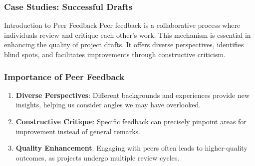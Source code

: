 \documentclass[aspectratio=169]{beamer}
\begin{document}
\begin{frame}[fragile]
    \frametitle{Case Studies: Successful Drafts}
    \begin{block}{Introduction to Peer Feedback}
        Peer feedback is a collaborative process where individuals review and critique each other's work. This mechanism is essential in enhancing the quality of project drafts. It offers diverse perspectives, identifies blind spots, and facilitates improvements through constructive criticism.
    \end{block}
\end{frame}

\begin{frame}[fragile]
    \frametitle{Importance of Peer Feedback}
    \begin{enumerate}
        \item \textbf{Diverse Perspectives}: Different backgrounds and experiences provide new insights, helping us consider angles we may have overlooked.
        \item \textbf{Constructive Critique}: Specific feedback can precisely pinpoint areas for improvement instead of general remarks.
        \item \textbf{Quality Enhancement}: Engaging with peers often leads to higher-quality outcomes, as projects undergo multiple review cycles.
    \end{enumerate}
\end{frame}
\end{document}
